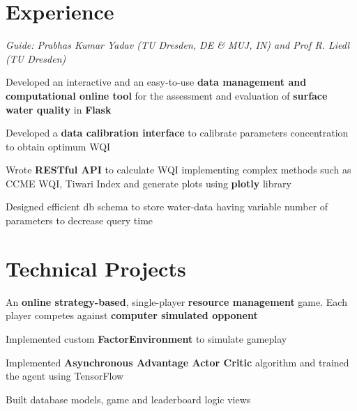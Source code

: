 \documentclass[]{deedy-resume-openfont}
\begin{document}
\begin{minipage}[t]{0.69\textwidth}

\section{Experience}
\textit{Guide: Prabhas Kumar Yadav (TU Dresden, DE \& MUJ, IN) and Prof R. Liedl (TU Dresden)}
\vspace{\topsep}
\begin{tightemize}
\item Developed an interactive and an easy-to-use \textbf{data management and computational online tool} for the assessment and evaluation of \textbf{surface water quality} in \textbf{Flask} \item Developed a \textbf{data calibration interface} to calibrate parameters concentration to obtain optimum WQI \item Wrote \textbf{RESTful API} to calculate WQI implementing complex methods such as CCME WQI, Tiwari Index and generate plots using \textbf{plotly} library \item Designed efficient db schema to store water-data having variable number of parameters to decrease query time
\end{tightemize}
\sectionsep

\section{Technical Projects}

\begin{tightemize}
\item An \textbf{online strategy-based}, single-player \textbf{resource management} game. Each player competes against \textbf{computer simulated opponent} \item Implemented custom \textbf{FactorEnvironment} to simulate gameplay  \item Implemented \textbf{Asynchronous Advantage Actor Critic} algorithm and trained the  agent using TensorFlow \item Built database models, game and leaderboard logic views
\end{tightemize}
\sectionsep


\end{minipage}
\end{document}
